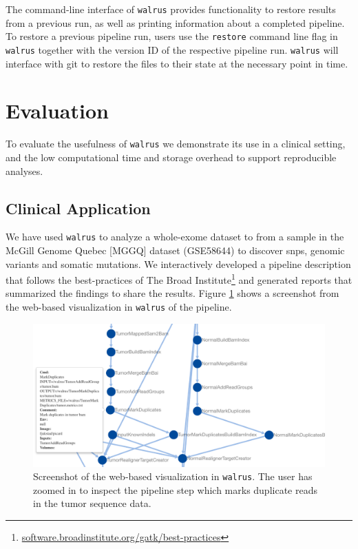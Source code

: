 The command-line interface of \texttt{walrus} provides functionality to restore
results from a previous run, as well as printing information about a completed
pipeline.  To restore a previous pipeline run, users use the \texttt{restore}
command line flag in \texttt{walrus} together with the version ID of the
respective pipeline run. \texttt{walrus} will interface with git to restore the
files to their state at the necessary point in time.

\section{Evaluation}
To evaluate the usefulness of \texttt{walrus} we demonstrate its use in a
clinical setting, and the low computational time and storage overhead to support
reproducible analyses.

\subsection{Clinical Application} 
We have used \texttt{walrus} to analyze a whole-exome dataset to from a sample
in the McGill Genome Quebec [MGGQ] dataset (GSE58644)\cite{tofigh2014prognostic}
to discover \glspl{snp}, genomic variants and somatic mutations. We
interactively developed a pipeline description that follows the best-practices
of The Broad
Institute\footnote{\url{software.broadinstitute.org/gatk/best-practices}} and
generated reports that summarized the findings to share the results. Figure
\ref{webshotfig} shows a screenshot from the web-based visualization in
\texttt{walrus} of the pipeline. 

\begin{figure}
    \centering 
    \includegraphics[width=12cm]{figures/webshot.png} 
    \caption{Screenshot of the web-based visualization in \texttt{walrus}. The
    user has zoomed in to inspect the pipeline step which marks duplicate reads
    in the tumor sequence data.}
    \label{webshotfig}
\end{figure} 


